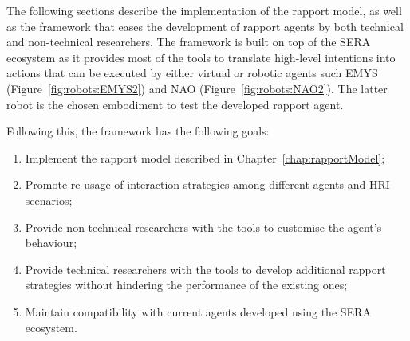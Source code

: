 \label{chap:proposedapproach}

The following sections describe the implementation of the rapport model, as well as the framework that eases the development of rapport agents by both technical and non-technical researchers. The framework is built on top of the \ac{SERA} ecosystem as it provides most of the tools to translate high-level intentions into actions that can be executed by either virtual or robotic agents such \ac{EMYS} (Figure~\ref{fig:robots:EMYS2}) and NAO (Figure~\ref{fig:robots:NAO2}). The latter robot is the chosen embodiment to test the developed rapport agent.

Following this, the framework has the following goals:
\begin{enumerate}
	\item Implement the rapport model described in Chapter~\ref{chap:rapportModel};
	\item Promote re-usage of interaction strategies among different agents and \ac{HRI} scenarios;
	\item Provide non-technical researchers with the tools to customise the agent's behaviour;
	\item Provide technical researchers with the tools to develop additional rapport strategies without hindering the performance of the existing ones;	
	\item Maintain compatibility with current agents developed using the \ac{SERA} ecosystem.
\end{enumerate}


